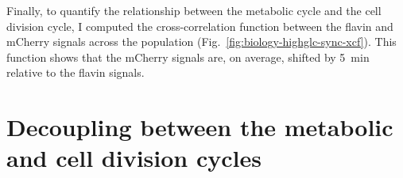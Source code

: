 Finally, to quantify the relationship between the metabolic cycle and the cell division cycle, I computed the cross-correlation function between the flavin and mCherry signals across the population (Fig.\ \ref{fig:biology-highglc-sync-xcf}).
This function shows that the mCherry signals are, on average, shifted by \SI{5}{\minute} relative to the flavin signals.


\section{Decoupling between the metabolic and cell division cycles}
\label{sec:biology-abrupt}

